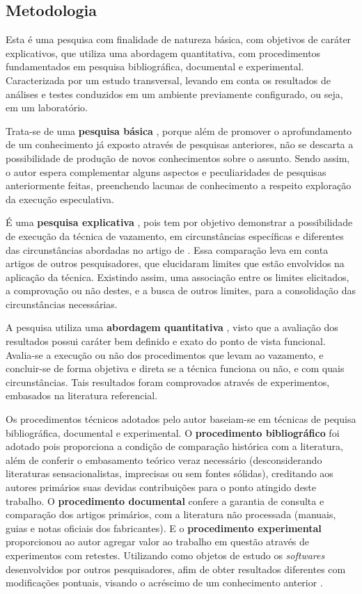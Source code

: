 \documentclass[
	article,			    %
	12pt,				    %
	oneside,			    %
	a4paper,			    %
	chapter=TITLE,		    %
	section=TITLE,		    %
	subsection=TITLE,	    %
	english,			    %
	brazil,				    %
	sumario=tradicional
]{abntex2}
\begin{document}
\subsection{Metodologia}
Esta é uma pesquisa com finalidade de natureza básica, com objetivos de caráter explicativos, que utiliza uma abordagem quantitativa, com procedimentos fundamentados em pesquisa bibliográfica, documental e experimental. Caracterizada por um estudo transversal, levando em conta os resultados de análises e testes conduzidos em um ambiente previamente configurado, ou seja, em um laboratório.

Trata-se de uma \textbf{pesquisa básica} \cite{Fernando1987Por}, porque além de promover o aprofundamento de um conhecimento já exposto através de pesquisas anteriores, não se descarta a possibilidade de produção de novos conhecimentos sobre o assunto. Sendo assim, o autor espera complementar alguns aspectos e peculiaridades de pesquisas anteriormente feitas, preenchendo lacunas de conhecimento a respeito exploração da execução especulativa.

É uma \textbf{pesquisa explicativa} \cite{Rampazzo2005Metodologia}, pois tem por objetivo demonstrar a possibilidade de execução da técnica de vazamento, em circunstâncias específicas e diferentes das circunstâncias abordadas no artigo de . Essa comparação leva em conta artigos de outros pesquisadores, que elucidaram limites que estão envolvidos na aplicação da técnica. Existindo assim, uma associação entre os limites elicitados, a comprovação ou não destes, e a busca de outros limites, para a consolidação das circunstâncias necessárias.

A pesquisa utiliza uma \textbf{abordagem quantitativa} \cite{Mauro2009Metodologia}, visto que a avaliação dos resultados possui caráter bem definido e exato do ponto de vista funcional. Avalia-se a execução ou não dos procedimentos que levam ao vazamento, e concluir-se de forma objetiva e direta se a técnica funciona ou não, e com quais circunstâncias. Tais resultados foram comprovados através de experimentos, embasados na literatura referencial.

Os procedimentos técnicos adotados pelo autor baseiam-se em técnicas de pequisa bibliográfica, documental e experimental. O \textbf{procedimento bibliográfico} foi adotado pois proporciona a condição de comparação histórica com a literatura, além de conferir o embasamento teórico veraz necessário (desconsiderando literaturas sensacionalistas, imprecisas ou sem fontes sólidas), creditando aos autores primários suas devidas contribuições para o ponto atingido deste trabalho. O \textbf{procedimento documental} confere a garantia de consulta e comparação dos artigos primários, com a literatura não processada (manuais, guias e notas oficiais dos fabricantes). E o \textbf{procedimento experimental} proporcionou ao autor agregar valor ao trabalho em questão através de experimentos com retestes. Utilizando como objetos de estudo os \emph{softwares} desenvolvidos por outros pesquisadores, afim de obter resultados diferentes com modificações pontuais, visando o acréscimo de um conhecimento anterior \cite{Praca2015Metodologia}.
\end{document}
